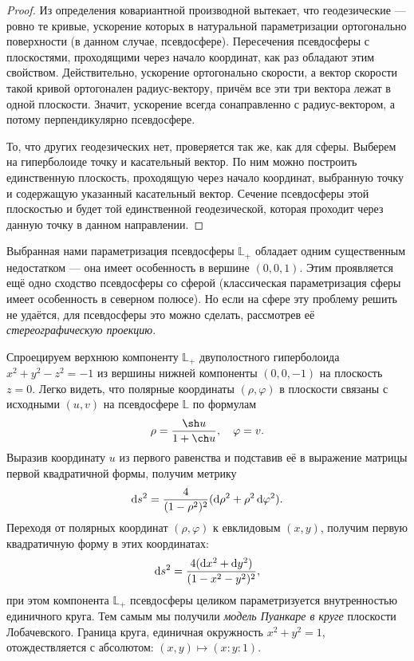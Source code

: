 \begin{proof}
	Из определения ковариантной производной вытекает, что геодезические --- ровно те кривые, ускорение которых в натуральной параметризации ортогонально поверхности (в данном случае, псевдосфере). Пересечения псевдосферы с плоскостями, проходящими через начало координат, как раз обладают этим свойством. Действительно, ускорение ортогонально скорости, а вектор скорости такой кривой ортогонален радиус-вектору, причём все эти три вектора лежат в одной плоскости. Значит, ускорение всегда сонаправленно с радиус-вектором, а потому перпендикулярно псевдосфере.

	То, что других геодезических нет, проверяется так же, как для сферы. Выберем на гиперболоиде точку и касательный вектор. По ним можно построить единственную плоскость, проходящую через начало координат, выбранную точку и содержащую указанный касательный вектор. Сечение псевдосферы этой плоскостью и будет той единственной геодезической, которая проходит через данную точку в данном направлении.
\end{proof}

Выбранная нами параметризация псевдосферы $\mathbb{L}_+$ обладает одним существенным недостатком --- она имеет особенность в вершине $(0, 0, 1)$. Этим проявляется ещё одно сходство псевдосферы со сферой (классическая параметризация сферы имеет особенность в северном полюсе). Но если на сфере эту проблему решить не удаётся, для псевдосферы это можно сделать, рассмотрев её \textit{стереографическую проекцию}.

Спроецируем верхнюю компоненту $\mathbb{L}_+$ двуполостного гиперболоида $x^2 + y^2 - z^2 = -1$ из вершины нижней компоненты $(0, 0, -1)$ на плоскость $z = 0$. Легко видеть, что полярные координаты $(\rho, \varphi)$ в плоскости связаны с исходными $(u, v)$ на псевдосфере $\mathbb{L}$ по формулам
\begin{equation} \label{eq:PolarProjection}
	\rho = \frac{\sh u}{1 + \ch u},\quad\varphi = v.
\end{equation}
Выразив координату $u$ из первого равенства и подставив её в выражение матрицы первой квадратичной формы, получим метрику
\[
	\mathop{}\!\mathrm{d} s^2 = \frac{4}{(1 - \rho^2)^2}(\mathop{}\!\mathrm{d}\rho^2 + \rho^2\mathop{}\!\mathrm{d}\varphi^2).
\]
Переходя от полярных координат $(\rho, \varphi)$ к евклидовым $(x, y)$, получим первую квадратичную форму в этих координатах:
\begin{equation} \label{eq:PoincareMetrics}
	\mathop{}\!\mathrm{d} s^2 = \frac{4(\mathop{}\!\mathrm{d} x^2 + \mathop{}\!\mathrm{d} y^2)}{(1 - x^2 - y^2)^2},
\end{equation}
при этом компонента $\mathbb{L}_+$ псевдосферы целиком параметризуется внутренностью единичного круга. Тем самым мы получили \textit{модель Пуанкаре в круге} плоскости Лобачевского. Граница круга, единичная окружность $x^2 + y^2 = 1$, отождествляется с абсолютом: $(x, y) \mapsto (x : y : 1)$.

